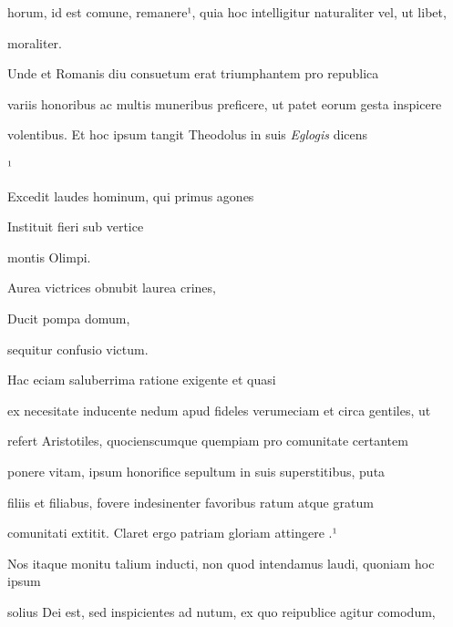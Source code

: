 horum, id est comune, remanere¹, quia hoc intelligitur naturaliter vel, ut libet,

\splitlines

moraliter. 

\indentK Unde et Romanis diu consuetum erat triumphantem pro republica

\fulllines

variis honoribus ac multis muneribus preficere, ut patet eorum gesta inspicere

volentibus. Et hoc ipsum tangit Theodolus in suis \textit{Eglogis} dicens

\splitlines

¹

\indentKcyt Excedit laudes hominum, qui primus agones

\indentKcyt Instituit fieri sub vertice

\splitlines

\indentKcyt \phantom{Instituit fieri sub vertice }montis Olimpi.	

\indentKcyt Aurea victrices obnubit laurea crines,

\indentKcyt Ducit pompa domum,

\splitlines

\indentKcyt \phantom{Ducit pompa domum, }sequitur confusio victum.

\indentK Hac eciam saluberrima ratione exigente et quasi

\fulllines

ex necesitate inducente nedum apud fideles verumeciam et circa gentiles, ut

refert Aristotiles, quocienscumque quempiam pro comunitate certantem 

 ponere vitam, ipsum honorifice sepultum in suis superstitibus, puta

filiis et filiabus, fovere indesinenter favoribus ratum atque gratum

comunitati extitit. Claret ergo patriam  gloriam attingere .¹

\indentP Nos itaque monitu talium inducti, non quod intendamus laudi, quoniam hoc ipsum

solius Dei est, sed inspicientes ad nutum, ex quo reipublice agitur comodum,

